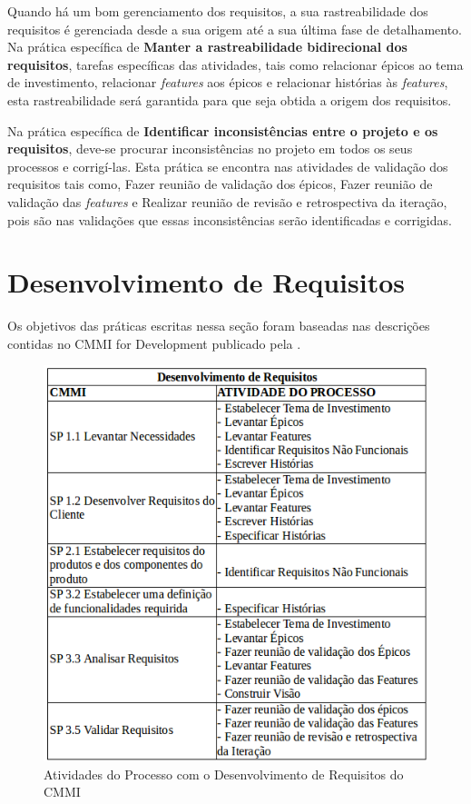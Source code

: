 Quando há um bom gerenciamento dos requisitos, a sua rastreabilidade dos requisitos é 
gerenciada desde a sua origem até a sua última fase de detalhamento. Na prática específica
de \textbf{Manter a rastreabilidade bidirecional dos requisitos}, tarefas específicas das
atividades, tais como relacionar épicos ao tema de investimento, relacionar 
\textit{features} aos épicos e relacionar histórias às \textit{features}, esta
rastreabilidade será garantida para que seja obtida a origem dos requisitos.

Na prática específica de \textbf{Identificar inconsistências entre o projeto e os 
requisitos}, deve-se procurar inconsistências no projeto em todos os seus processos e 
corrigí-las. Esta prática se encontra nas atividades de validação dos requisitos tais
como, Fazer reunião de validação dos épicos, Fazer reunião de validação das 
\textit{features} e Realizar reunião de revisão e retrospectiva da iteração, pois são 
nas validações que essas inconsistências serão identificadas e corrigidas.

\section{Desenvolvimento de Requisitos}

Os objetivos das práticas escritas nessa seção foram baseadas nas descrições contidas no CMMI for Development publicado pela .

\begin{figure}[!htb]
\centering
\includegraphics[scale=0.6]{figuras/desenvolvimento.png}
\caption{Atividades do Processo com o Desenvolvimento de Requisitos do CMMI}
\label{fig:desenvolvimento}
\end{figure}

